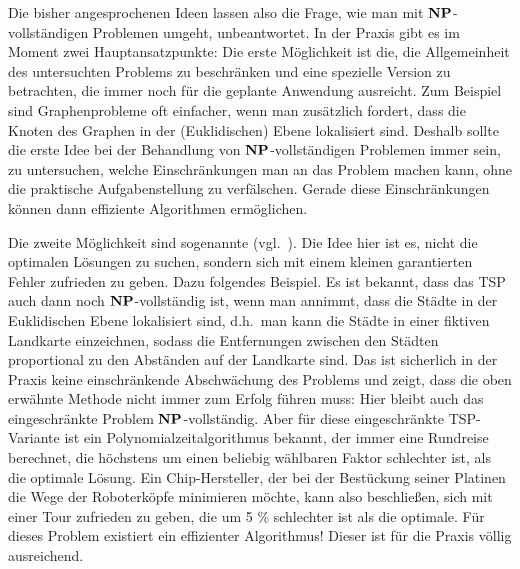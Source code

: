 \goodbreak
Die bisher angesprochenen Ideen lassen also die Frage, wie man mit
$\mathbf{N}\mathbf{P}$-vollständigen Problemen umgeht, unbeantwortet. In der Praxis
gibt es im Moment zwei Hauptansatzpunkte: Die erste Möglichkeit ist
die, die Allgemeinheit des untersuchten Problems zu beschränken und
eine spezielle Version zu betrachten, die immer noch für die geplante
Anwendung ausreicht. Zum Beispiel sind Graphenprobleme oft einfacher,
wenn man zusätzlich fordert, dass die Knoten des Graphen in der
(Euklidischen) Ebene lokalisiert sind. Deshalb sollte die erste Idee
bei der Behandlung von $\mathbf{N}\mathbf{P}$-vollständigen Problemen immer sein, zu
untersuchen, welche Einschränkungen man an das Problem machen kann,
ohne die praktische Aufgabenstellung zu verfälschen. Gerade diese
Einschränkungen können dann effiziente Algorithmen ermöglichen.

Die zweite Möglichkeit sind sogenannte
 (vgl.~\cite{ACGJNO99}). Die Idee
hier ist es, nicht die optimalen Lösungen zu suchen, sondern sich mit
einem kleinen garantierten Fehler zufrieden zu geben.  Dazu folgendes
Beispiel. Es ist bekannt, dass das \textsf{TSP} auch dann noch
$\mathbf{N}\mathbf{P}$-vollständig ist, wenn man annimmt, dass die Städte in der
Euklidischen Ebene lokalisiert sind, d.h.~man kann die Städte in einer
fiktiven Landkarte einzeichnen, sodass die Entfernungen zwischen den
Städten proportional zu den Abständen auf der Landkarte sind.  Das ist
sicherlich in der Praxis keine einschränkende Abschwächung des
Problems und zeigt, dass die oben erwähnte Methode nicht immer zum
Erfolg führen muss: Hier bleibt auch das eingeschränkte Problem
$\mathbf{N}\mathbf{P}$-vollständig. Aber für diese eingeschränkte \textsf{TSP}-Variante
ist ein Polynomialzeitalgorithmus bekannt, der immer eine Rundreise
berechnet, die höchstens um einen beliebig wählbaren Faktor schlechter
ist, als die optimale Lösung. Ein Chip-Hersteller, der bei der
Bestückung seiner Platinen die Wege der Roboterköpfe minimieren
möchte, kann also beschließen, sich mit einer Tour zufrieden zu geben,
die um 5 \% schlechter ist als die optimale. Für dieses Problem
existiert ein effizienter Algorithmus!  Dieser ist für die Praxis
völlig ausreichend.
